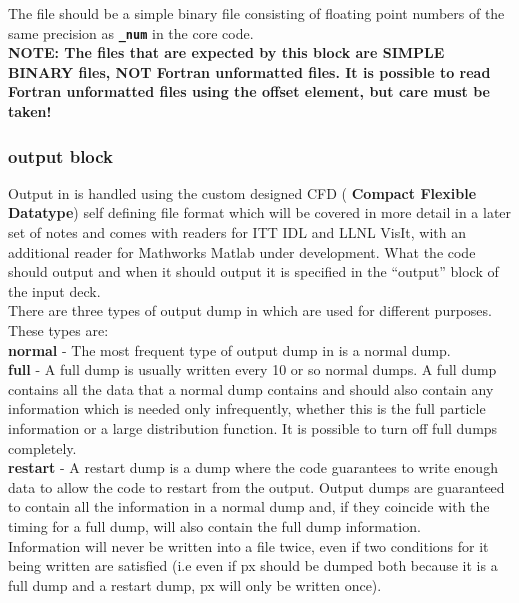 \documentclass[12pt,a4paper]{article}
\newcommand{\emphtext}{\color{warwickdark} \fontfamily{phv}\selectfont\large\bf}
\newcommand{\inlinecode}[1]{{\color{warwickred} \bf\texttt{#1}}}
\newcommand{\inlineemph}[1]{{\color{warwicklight} \bf{#1}}}
\newcommand{\EPOCH}{{\color{warwickdark}\fontfamily{phv}\selectfont{EPOCH}}}
\begin{document}
The file should be a simple binary file consisting of floating point numbers of
the same precision as \inlinecode{\_num} in the core {\EPOCH} code.\\

{\emphtext NOTE: The files that are expected by this block are SIMPLE BINARY
files, NOT Fortran unformatted files. It is possible to read Fortran
unformatted files using the offset element, but care must be taken!}\\


\subsubsection{\inlineemph{output} block}
Output in {\EPOCH} is handled using the custom designed CFD (\inlineemph{Compact
Flexible Datatype}) self defining file format which will be covered in more
detail in a later set of notes and comes with readers for ITT IDL and LLNL
VisIt, with an additional reader for Mathworks Matlab under
development. What the code should output and when it should output it is
specified in the ``output'' block of the input deck. \\

There are three types of output dump in {\EPOCH} which are used for different
purposes. These types are:\\

{\emphtext normal} - The most frequent type of output dump in {\EPOCH} is a
normal dump.\\

{\emphtext full} - A full dump is usually written every 10 or so normal
dumps. A full dump contains all the data that a normal dump contains and should
also contain any information which is needed only infrequently, whether this is
the full particle information or a large distribution function. It is possible
to turn off full dumps completely.\\

{\emphtext restart} - A restart dump is a dump where the code guarantees to
write enough data to allow the code to restart from the output. Output dumps
are guaranteed to contain all the information in a normal dump and, if they
coincide with the timing for a full dump, will also contain the full dump
information.\\

Information will never be written into a file twice, even if two conditions for
it being written are satisfied (i.e even if px should be dumped both because it
is a full dump and a restart dump, px will only be written once).\\
\end{document}
